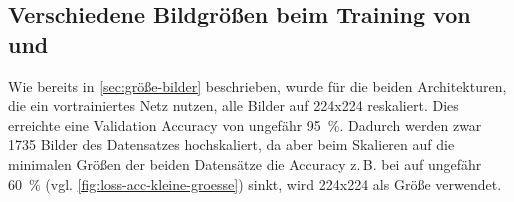


\subsection{Verschiedene Bildgrößen beim  Training von \PreDog{} und \PreBig{}}

Wie bereits in \autoref{sec:größe-bilder} beschrieben, wurde für die beiden
Architekturen, die ein vortrainiertes Netz nutzen, alle Bilder auf 224x224
reskaliert. Dies erreichte eine Validation Accuracy von ungefähr
\SI{95}{\percent}. Dadurch werden zwar 1735 Bilder des Datensatzes hochskaliert,
da aber beim Skalieren auf die minimalen Größen der beiden Datensätze die
Accuracy z.\,B. bei \PreDog{} auf ungefähr \SI{60}{\percent} (vgl.
\autoref{fig:loss-acc-kleine-groesse}) sinkt, wird 224x224 als Größe verwendet.

\subsection{\PreBig{}}


